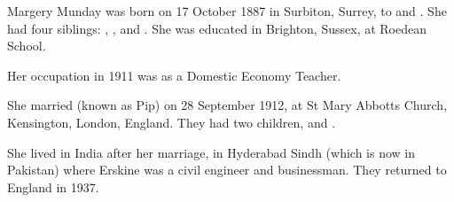 
Margery Munday was born on 17 October 1887 in Surbiton, Surrey, to  and .
She had four siblings: , ,  and .
She was educated in Brighton, Sussex, at Roedean School.

Her occupation in 1911 was as a Domestic Economy Teacher. \cite{MMundayOccupation}

She married  (known as Pip) on 28 September 1912, at St Mary Abbotts Church, Kensington, London, England.  They had two children,  and .

She lived in India after her marriage, in Hyderabad Sindh (which is now in Pakistan)  where Erskine was a civil engineer and businessman.  They returned to England in 1937.

